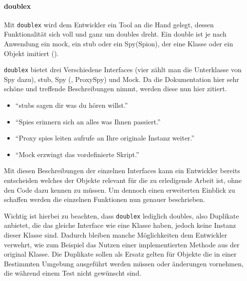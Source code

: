 \paragraph{doublex}\label{python-tools:doublex}\mbox{}
\newline
Mit \lstinline{doublex} wird dem Entwickler ein Tool an die Hand gelegt,
dessen Funktionalität sich voll und ganz um doubles dreht. Ein double ist je
nach Anwendung ein \Gls{mock}, ein \Gls{stub} oder ein Spy(Spion), der eine
Klasse oder ein Objekt imitiert (\cite{doublex:docs:1.8.1}).
\newline

\lstinline{doublex} bietet drei Verschiedene Interfaces (vier zählt man die
Unterklasse von Spy dazu), \Gls{stub}, Spy (, ProxySpy) und Mock. Da die Dokumentation
hier sehr schöne und treffende Beschreibungen nimmt, werden diese nun hier zitiert.
\begin{itemize}
    \item "`\Glspl{stub} sagen dir was du hören willst."' 
    \item "`Spies erinnern sich an alles was Ihnen passiert."' 
    \item "`Proxy spies leiten aufrufe an Ihre originale Instanz weiter."' 
    \item "`Mock erzwingt das vordefinierte Skript."' 
\end{itemize}
\noindent
Mit diesen Beschreibungen der einzelnen Interfaces kann ein Entwickler bereits
entscheiden welches der Objekte relevant für die zu erledigende Arbeit ist, ohne
den Code dazu kennen zu müssen. Um dennoch einen erweiterten Einblick zu
schaffen werden die einzelnen Funktionen nun genauer beschrieben.

Wichtig ist hierbei zu beachten, dass \lstinline{doublex} lediglich
doubles, also Duplikate anbietet, die das gleiche Interface wie eine Klasse
haben, jedoch keine Instanz dieser Klasse sind. Dadurch bleiben manche
Möglichkeiten dem Entwickler verwehrt, wie zum Beispiel das Nutzen einer
implementierten Methode aus der original Klasse.
Die Duplikate sollen als Ersatz gelten für Objekte die in einer Bestimmten
Umgebung ausgeführt werden müssen oder änderungen vornehmen, die während
einem Test nicht gewünscht sind.
\newline

